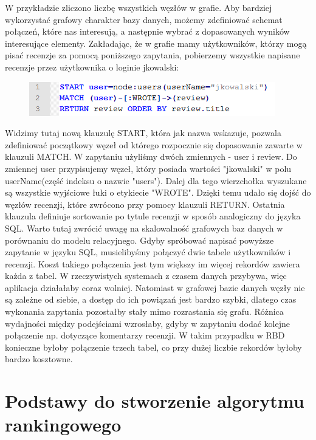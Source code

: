 W przykładzie zliczono liczbę wszystkich węzłów w grafie. Aby bardziej wykorzystać grafowy charakter bazy danych, możemy zdefiniować schemat połączeń, które nas interesują, a następnie wybrać z dopasowanych wyników interesujące elementy. Zakładając, że w grafie mamy użytkowników, którzy mogą pisać recenzje za pomocą poniższego zapytania, pobierzemy wszystkie napisane recenzje przez użytkownika o loginie jkowalski:

\begin{figure}[H]
	\centering
	\includegraphics{images/cypher_q2.png}
\end{figure}

Widzimy tutaj nową klauzulę START, która jak nazwa wskazuje, pozwala zdefiniować początkowy węzeł od którego rozpocznie się dopasowanie zawarte w klauzuli MATCH. W zapytaniu użyliśmy dwóch zmiennych - user i review. Do zmiennej user przypisujemy węzeł, który posiada wartości "jkowalski" w polu userName(część indeksu o nazwie "users"). Dalej dla tego wierzchołka wyszukane są wszystkie wyjściowe łuki o etykiecie "WROTE". Dzięki temu udało się dojść do węzłów recenzji, które zwrócono przy pomocy klauzuli RETURN. Ostatnia klauzula definiuje sortowanie po tytule recenzji w sposób analogiczny do języka SQL. Warto tutaj zwrócić uwagę na skalowalność grafowych baz danych w porównaniu do modelu relacyjnego. Gdyby spróbować napisać powyższe zapytanie w języku SQL, musielibyśmy połączyć dwie tabele użytkowników i recenzji. Koszt takiego połączenia jest tym większy im więcej rekordów zawiera każda z tabel. W rzeczywistych systemach z czasem danych przybywa, więc aplikacja działałaby coraz wolniej. Natomiast w grafowej bazie danych węzły nie są zależne od siebie, a dostęp do ich powiązań jest bardzo szybki, dlatego czas wykonania zapytania pozostałby stały mimo rozrastania się grafu. Różnica wydajności między podejściami wzrosłaby, gdyby w zapytaniu dodać kolejne połączenie np. dotyczące komentarzy recenzji. W takim przypadku w RBD konieczne byłoby połączenie trzech tabel, co przy dużej liczbie rekordów byłoby bardzo kosztowne.


\section{Podstawy do stworzenie algorytmu rankingowego}
\label{sec:algTeotia}

